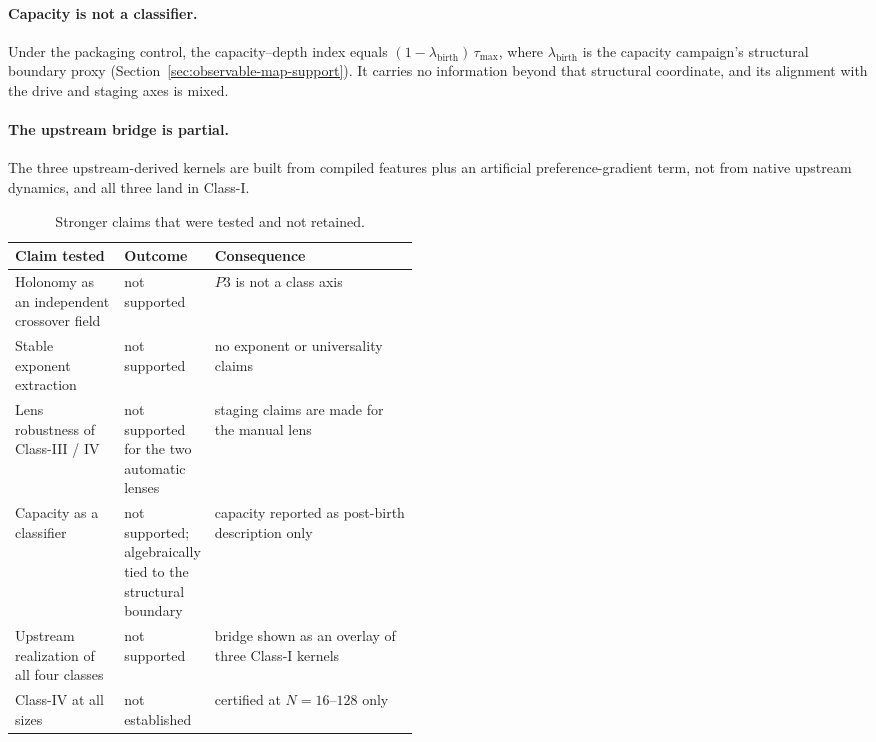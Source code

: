 \paragraph{Capacity is not a classifier.} Under the packaging control, the capacity--depth index equals $(1-\lambda_{\mathrm{birth}})\,\tau_{\max}$, where $\lambda_{\mathrm{birth}}$ is the capacity campaign's structural boundary proxy (Section~\ref{sec:observable-map-support}). It carries no information beyond that structural coordinate, and its alignment with the drive and staging axes is mixed.

\paragraph{The upstream bridge is partial.} The three upstream-derived kernels are built from compiled features plus an artificial preference-gradient term, not from native upstream dynamics, and all three land in Class-I.

\begin{table}[tbp]
\centering
\small
\caption{Stronger claims that were tested and not retained.}
\label{tab:appendix-negative-constraints}
\begin{tabularx}{\linewidth}{@{}L{0.27\linewidth}L{0.2\linewidth}Y@{}}
\toprule
Claim tested & Outcome & Consequence \\
\midrule
Holonomy as an independent crossover field & not supported & $P3$ is not a class axis \\
Stable exponent extraction & not supported & no exponent or universality claims \\
Lens robustness of Class-III / IV & not supported for the two automatic lenses & staging claims are made for the manual lens \\
Capacity as a classifier & not supported; algebraically tied to the structural boundary & capacity reported as post-birth description only \\
Upstream realization of all four classes & not supported & bridge shown as an overlay of three Class-I kernels \\
Class-IV at all sizes & not established & certified at $N=16$--$128$ only \\
\bottomrule
\end{tabularx}
\end{table}
